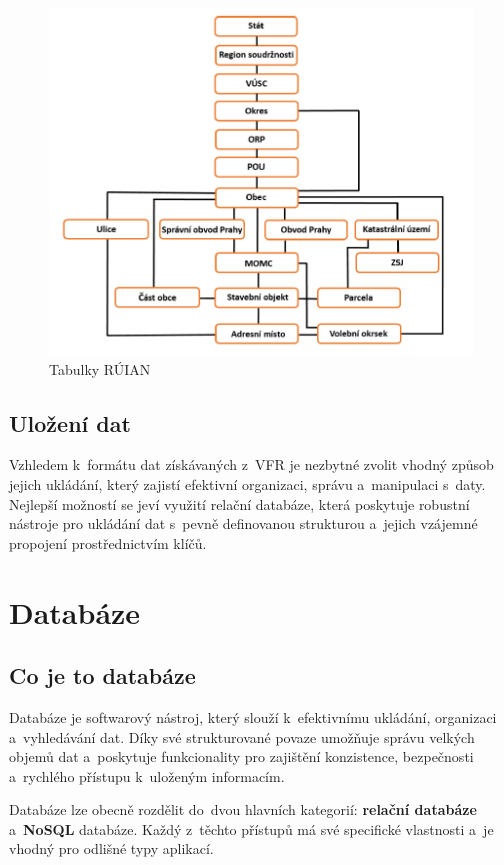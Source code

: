 \documentclass[czech, kiv, ba, he, iso690auyr, pdf]{fasthesis}
\begin{document}
\begin{figure}[ht]
    \centering
    \includegraphics[width=\textwidth]{figures/ruian_tables.png}
    \caption{Tabulky RÚIAN}
    \label{fig:ruian_tables}
\end{figure}


\section{Uložení dat}
Vzhledem k~formátu dat získávaných z~VFR je nezbytné zvolit 
vhodný způsob jejich ukládání, který zajistí efektivní organizaci, správu a~manipulaci s~daty. 
Nejlepší možností se jeví využití relační databáze, která poskytuje robustní nástroje pro 
ukládání dat s~pevně definovanou strukturou a~jejich vzájemné propojení prostřednictvím klíčů.

\chapter{Databáze}
\section{Co je to databáze}
Databáze je softwarový nástroj, který slouží k~efektivnímu ukládání, organizaci a~vyhledávání dat. 
Díky své strukturované povaze umožňuje správu velkých objemů dat a~poskytuje funkcionality pro 
zajištění konzistence, bezpečnosti a~rychlého přístupu k~uloženým informacím.

Databáze lze obecně rozdělit do~dvou hlavních kategorií: \textbf{relační databáze} a~\textbf{NoSQL} databáze. 
Každý z~těchto přístupů má své specifické vlastnosti a~je vhodný pro odlišné typy aplikací.
\end{document}

